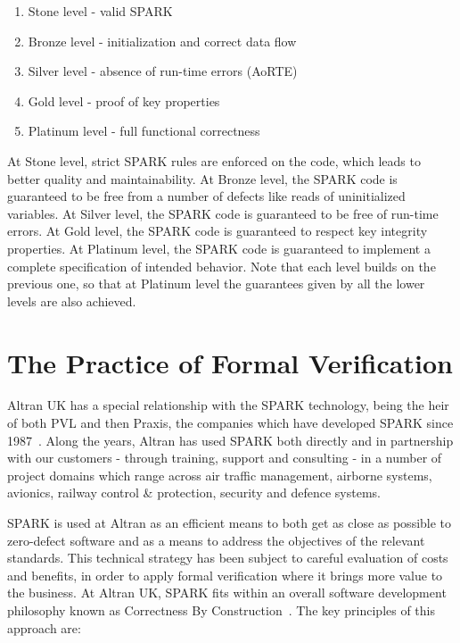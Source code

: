 \documentclass{llncs}
\begin{document}
\begin{enumerate}
\item Stone level - valid SPARK
\item Bronze level - initialization and correct data flow
\item Silver level - absence of run-time errors (AoRTE)
\item Gold level - proof of key properties
\item Platinum level - full functional correctness
\end{enumerate}

At Stone level, strict SPARK rules are enforced on the code, which leads to
better quality and maintainability. At Bronze level, the SPARK code is
guaranteed to be free from a number of defects like reads of uninitialized
variables. At Silver level, the SPARK code is guaranteed to be free of run-time
errors. At Gold level, the SPARK code is guaranteed to respect key integrity
properties. At Platinum level, the SPARK code is guaranteed to implement a
complete specification of intended behavior. Note that each level builds on the
previous one, so that at Platinum level the guarantees given by all the lower
levels are also achieved.

\section{The Practice of Formal Verification}

Altran UK has a special relationship with the SPARK technology, being the heir
of both PVL and then Praxis, the companies which have developed SPARK since
1987~\cite{Chapman2014}. Along the years, Altran has used SPARK both directly
and in partnership with our customers - through training, support and
consulting - in a number of project domains which range across air traffic
management, airborne systems, avionics, railway control \& protection, security
and defence systems.

SPARK is used at Altran as an efficient means to both get as close as possible
to zero-defect software and as a means to address the objectives of the
relevant standards. This technical strategy has been subject to careful
evaluation of costs and benefits, in order to apply formal verification where
it brings more value to the business. At Altran UK, SPARK fits within an
overall software development philosophy known as Correctness By
Construction~\cite{Croxford2005Manifesto}. The key principles of this approach
are:
\end{document}
